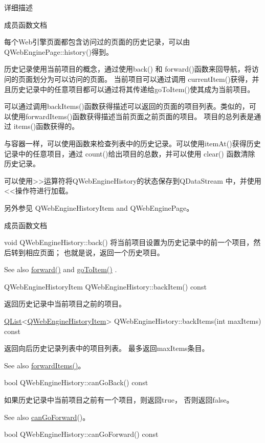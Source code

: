 详细描述

成员函数文档

每个Web引擎页面都包含访问过的页面的历史记录，可以由QWebEnginePage::history()得到。

历史记录使用当前项目的概念，通过使用back() 和 forward()函数来回导航，将访问的页面划分为可以访问的页面。 当前项目可以通过调用 currentItem()获得，并且历史记录中的任意项目都可以通过将其传递给goToItem()使其成为当前项目。

可以通过调用backItems()函数获得描述可以返回的页面的项目列表。类似的，可以使用forwardItems()函数获得描述当前页面之前页面的项目。 项目的总列表是通过 items()函数获得的。

与容器一样，可以使用函数来检查列表中的历史记录。可以使用itemAt()获得历史记录中的任意项目，通过 count()给出项目的总数，并可以使用 clear() 函数清除历史记录。

可以使用>>运算符将QWebEngineHistory的状态保存到QDataStream 中，并使用<<操作符进行加载。

另外参见 QWebEngineHistoryItem and QWebEnginePage。

成员函数文档

void QWebEngineHistory::back()
将当前项目设置为历史记录中的前一个项目，然后转到相应页面； 也就是说，返回一个历史项目。

See also \href{https://doc.qt.io/qt-5/qwebenginehistory.html#forward}{forward()}  and \href{https://doc.qt.io/qt-5/qwebenginehistory.html#goToItem}{goToItem()} .


QWebEngineHistoryItem QWebEngineHistory::backItem() const

返回历史记录中当前项目之前的项目。

\href{https://github.com/QtDocumentCN/QtDocumentCN/blob/master/Src/L/QList/QList.md}{QList}<\href{https://github.com/QtDocumentCN/QtDocumentCN/blob/master/Src/W/QWebEngineHistoryItem/QWebEngineHistoryItem.md}{QWebEngineHistoryItem}> QWebEngineHistory::backItems(int maxItems) const


返回向后历史记录列表中的项目列表。 最多返回maxItems条目。

See also \href{https://doc.qt.io/qt-5/qwebenginehistory.html#forwardItems}{forwardItems()}。

bool QWebEngineHistory::canGoBack() const

如果历史记录中当前项目之前有一个项目，则返回true， 否则返回false。

See also \href{https://doc.qt.io/qt-5/qwebenginehistory.html#canGoForward}{canGoForward}()。


bool QWebEngineHistory::canGoForward() const

